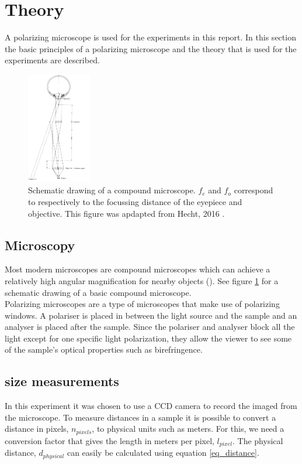 \section{Theory}

A polarizing microscope is used for the experiments in this report. In this section the basic principles of a polarizing microscope and the theory that is used for the experiments are described.

\begin{figure}
    \includegraphics[width=0.25\textwidth]{afbeeldingen/compound_microscope.png}
  	\caption{Schematic drawing of a compound microscope. $f_{e}$ and $f_{o}$ correspond to respectively to the focussing distance of the eyepiece and objective. This figure was apdapted from Hecht, 2016 \cite{hecht}.}
  	\label{fig_compound_microscope}
\end{figure}

\subsection{Microscopy}
Most modern microscopes are compound microscopes which can achieve a relatively high angular magnification for nearby objects (\cite{hecht}). See figure \ref{fig_compound_microscope} for a schematic drawing of a basic compound microscope.\\
Polarizing microscopes are a type of microscopes that make use of polarizing windows. A polariser is placed in between the light source and the sample and an analyser is placed after the sample. Since the polariser and analyser block all the light except for one specific light polarization, they allow the viewer to see some of the sample's optical properties such as birefringence. \\

\subsection{size measurements}
In this experiment it was chosen to use a CCD camera to record the imaged from the microscope. To measure distances in a sample it is possible to convert a distance in pixels, $n_{pixels}$, to physical units such as meters. For this, we need a conversion factor that gives the length in meters per pixel, $l_{pixel}$. The physical distance, $d_{physical}$ can easily be calculated using equation \ref{eq_distance}.

